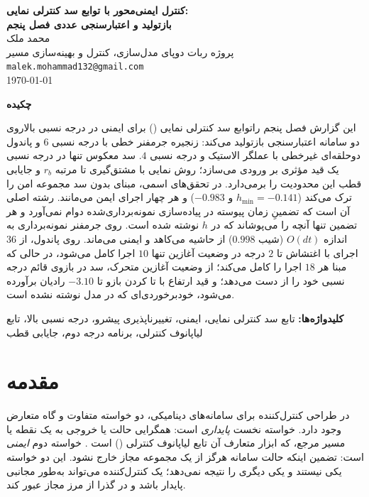\documentclass[10pt,twocolumn]{article}
\makeatletter
\newcommand{\en}[1]{\lr{#1}}
\newcommand{\md}{\lr{\textemdash}}
\newcommand{\nd}{\lr{\textendash}}
\newcommand{\reporttitle}{کنترل ایمنی‌محور با توابع سد کنترلی نمایی:\\[0.2em]
بازتولید و اعتبارسنجی عددی فصل پنجم}
\newcommand{\reportauthor}{محمد ملک}
\newcommand{\reportaffil}{پروژه ربات دوپای \en{RABBIT} \nd{} مدل‌سازی، کنترل و بهینه‌سازی مسیر}
\newcommand{\reportemail}{malek.mohammad132@gmail.com}
\makeatother
\begin{document}
\onecolumn
\begin{center}
    {\bfseries\Large \reporttitle}\\[0.8em]
    \reportauthor \\
    \small \reportaffil \\
    \small \texttt{\reportemail} \\[0.3em]
    \today
\end{center}
\vspace{1em}

\begin{center}
    {\bfseries\large چکیده}
\end{center}
\noindent
این گزارش فصل پنجم را\md{}توابع سد کنترلی نمایی (\en{ECBF}) برای ایمنی در درجه نسبی
بالا\md{}روی دو سامانه اعتبارسنجی بازتولید می‌کند: زنجیره جرم\nd{}فنر خطی با درجه نسبی $6$ و
پاندول دوحلقه‌ای غیرخطی با عملگر الاستیک و درجه نسبی $4$. سد معکوس تنها در درجه نسبی یک
قید مؤثری بر ورودی می‌سازد؛ روش نمایی با مشتق‌گیری تا مرتبه $r_b$ و جایابی قطب این محدودیت را
برمی‌دارد. در تحقق‌های اسمی، مبنای بدون سد مجموعه امن را ترک می‌کند ($h_{\min}=-0.141$ و
$-0.983$) و هر چهار اجرای \en{ECBF} ایمن می‌مانند. رشته اصلی آن است که تضمینِ زمان پیوسته در
پیاده‌سازی نمونه‌برداری‌شده دوام نمی‌آورد و هر تضمین تنها آنچه را می‌پوشاند که در $h$ نوشته
شده است. روی جرم\nd{}فنر نمونه‌برداری به اندازه $O(dt)$ (شیب $0.998$) از حاشیه می‌کاهد و
ایمنی می‌ماند. روی پاندول، از $36$ اجرای \en{ECBF} با اغتشاش تا $2$ درجه در وضعیت آغازین
تنها $10$ اجرا کامل می‌شود، در حالی که مبنا هر $18$ اجرا را کامل می‌کند؛ از وضعیت آغازین
متحرک، سد در بازوی قائم درجه نسبی خود را از دست می‌دهد؛ و قید ارتفاع با تا کردن بازو تا
$-3.10$ رادیان برآورده می‌شود، خودبرخوردی‌ای که در مدل نوشته نشده است.

\vspace{0.6em}
\noindent\textbf{کلیدواژه‌ها:} تابع سد کنترلی نمایی، ایمنی، تغییرناپذیری پیشرو،
درجه نسبی بالا، تابع لیاپانوف کنترلی، برنامه درجه دوم، جایابی قطب
\vspace{1em}
\twocolumn

\section{مقدمه}
در طراحی کنترل‌کننده برای سامانه‌های دینامیکی، دو خواسته متفاوت و گاه متعارض
وجود دارد. خواسته نخست \emph{پایداری} است: همگرایی حالت یا خروجی به یک نقطه یا
مسیر مرجع، که ابزار متعارف آن تابع لیاپانوف کنترلی (\en{CLF}) است
\cite{ames2014resclf}. خواسته دوم \emph{ایمنی} است: تضمین اینکه حالت سامانه
هرگز از یک مجموعه مجاز خارج نشود. این دو خواسته یکی نیستند و یکی دیگری را
نتیجه نمی‌دهد؛ یک کنترل‌کننده می‌تواند به‌طور مجانبی پایدار باشد و در گذرا از
مرز مجاز عبور کند.
\end{document}
